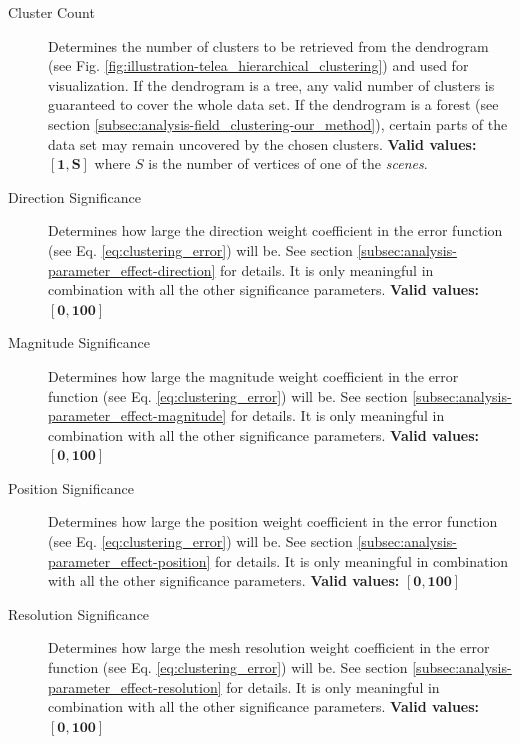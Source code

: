 \begin{description}
\item [Cluster Count] Determines the number of clusters to be retrieved from the dendrogram (see Fig. \ref{fig:illustration-telea_hierarchical_clustering}) and used for visualization. If the dendrogram is a tree, any valid number of clusters is guaranteed to cover the whole data set. If the dendrogram is a forest (see section \ref{subsec:analysis-field_clustering-our_method}), certain parts of the data set may remain uncovered by the chosen clusters. {\bf Valid values:} \(\bm{[1,S]}\) where \(S\) is the number of vertices of one of the {\it scenes}.
\item [Direction Significance] Determines how large the direction weight coefficient in the error function (see Eq. \ref{eq:clustering_error}) will be. See section \ref{subsec:analysis-parameter_effect-direction} for details. It is only meaningful in combination with all the other significance parameters\footnotemark. {\bf Valid values:} \(\bm{[0,100]}\)
\item [Magnitude Significance] Determines how large the magnitude weight coefficient in the error function (see Eq. \ref{eq:clustering_error}) will be. See section \ref{subsec:analysis-parameter_effect-magnitude} for details. It is only meaningful in combination with all the other significance parameters\footnotemark. {\bf Valid values:} \(\bm{[0,100]}\)
\item [Position Significance] Determines how large the position weight coefficient in the error function (see Eq. \ref{eq:clustering_error}) will be. See section \ref{subsec:analysis-parameter_effect-position} for details. It is only meaningful in combination with all the other significance parameters\footnotemark. {\bf Valid values:} \(\bm{[0,100]}\)
\item [Resolution Significance] Determines how large the mesh resolution weight coefficient in the error function (see Eq. \ref{eq:clustering_error}) will be. See section \ref{subsec:analysis-parameter_effect-resolution} for details. It is only meaningful in combination with all the other significance parameters\footnotemark. {\bf Valid values:} \(\bm{[0,100]}\)
\end{description}

\addtocounter{footnote}{-4}

